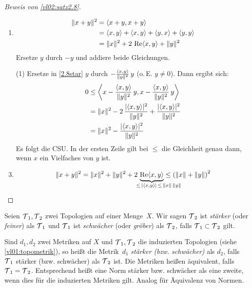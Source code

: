 \begin{proof}[Beweis von \cref{vl02:satz2.8}]\hfill
    \begin{enumerate}[(3)]
        \item
            \begin{align*}
                \norm{x+y}^2 
                &= \SP{x+y,x+y} 
                \\
                &= \SP{x,y} + \SP{x,y} + \SP{y,x} + \SP{y,y}
                \\
                &= \norm{x}^2 + 2\,\Re\SP{x,y} + \norm{y}^2
            \end{align*}
            Ersetze $y$ durch $-y$ und addiere beide Gleichungen.
            
        \item[(1)]
            Ersetze in \eqref{2.8star} $y$ durch
            $-\frac{\left\langle x,y\right\rangle}{\lVert y\rVert^2}\,y$ (o.\,E. $y\neq 0$). Dann ergibt
            sich:
            \begin{align*}
                0
                &\leq \left\langle
                    x-\frac{\left\langle x,y\right\rangle}{\lVert y\rVert^2}\,y, x - \frac{\left\langle x,y\right\rangle}{\lVert y\rVert^2}\,y 
                \right\rangle
                \\
                &= \lVert x\rVert^2 - 2\,\frac{\lvert\left\langle x,y\right\rangle\rvert^2}{\lVert y\rVert^2} +
                \frac{\lvert\left\langle x,y\right\rangle\rvert^2}{\lVert y\rVert^2}
                \\
                &= \lVert x\rVert^2 - \frac{\lvert\left\langle x,y\right\rangle\rvert^2}{\lVert y\rVert^2}
            \end{align*}
            Es folgt die CSU. In der ersten Zeile gilt bei $\leq$ die
            Gleichheit genau dann, wenn $x$ ein Vielfaches von $y$ ist.
            
        \item
            \[
                \norm{x+y}^2 = \norm{x}^2 + \norm{y}^2 + 
                2\,\underbrace{\Re\SP{x,y}}_{\smash{\mathclap{\qquad\leq\, \abs{\SP{x,y}}
                \,\leq\, \norm x\,\norm y}}}
                \leq \left( \norm x + \norm y \right)^2
            \]
    \end{enumerate}
\end{proof}

\begin{thEmpty}
    Seien $\operatorname{\mathcal{T}}_1,\operatorname{\mathcal{T}}_2$ zwei Topologien auf einer Menge~$X$. Wir sagen
    $\operatorname{\mathcal{T}}_2$ ist \emph{stärker} (oder \emph{feiner}) als $\operatorname{\mathcal{T}}_1$ und $\operatorname{\mathcal{T}}_1$ ist
    \emph{schwächer} (oder \emph{gröber}) als $\operatorname{\mathcal{T}}_2$, falls
    $\operatorname{\mathcal{T}}_1\subset\operatorname{\mathcal{T}}_2$ gilt.
    
    Sind $d_1,d_2$ zwei Metriken auf $X$ und $\operatorname{\mathcal{T}}_1,\operatorname{\mathcal{T}}_2$ die induzierten
    Topologien (siehe \cref{vl01:topometrik}),
    so heißt die Metrik~$d_1$ \emph{stärker (bzw. schwächer)} als $d_2$, falls
    $\operatorname{\mathcal{T}}_1$ stärker (bzw. schwächer) als $\operatorname{\mathcal{T}}_2$ ist. Die Metriken heißen
    äquivalent, falls $\operatorname{\mathcal{T}}_1=\operatorname{\mathcal{T}}_2$. Entsprechend heißt eine Norm stärker
    bzw. schwächer als eine zweite, wenn dies für die induzierten Metriken gilt.
    Analog für Äquivalenz von Normen.
\end{thEmpty}

